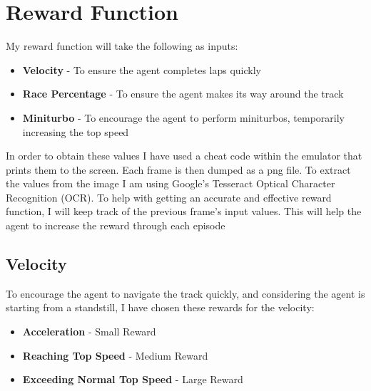 \documentclass{article}
\begin{document}
\section{Reward Function}
My reward function will take the following as inputs:
\begin{itemize}
    \item \textbf{Velocity} - To ensure the agent completes laps quickly
    \item \textbf{Race Percentage} - To ensure the agent makes its way around the track
    \item \textbf{Miniturbo} - To encourage the agent to perform miniturbos, temporarily increasing the top speed
\end{itemize}
In order to obtain these values I have used a cheat code within the emulator that prints them to the screen. Each frame is then dumped as a png file. To extract the values from the image I am using Google's Tesseract Optical Character Recognition (OCR).
To help with getting an accurate and effective reward function, I will keep track of the previous frame's input values. This will help the agent to increase the reward through each episode

\subsection{Velocity}
To encourage the agent to navigate the track quickly, and considering the agent is starting from a standstill, I have chosen these rewards for the velocity:
\begin{itemize}
    \item \textbf{Acceleration} - Small Reward
    \item \textbf{Reaching Top Speed} - Medium Reward
    \item \textbf{Exceeding Normal Top Speed} - Large Reward
\end{itemize}
\end{document}

